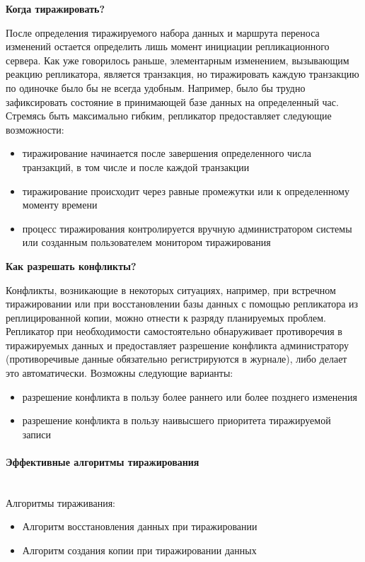 \bigbreak
\textbf{Когда тиражировать?}

После определения тиражируемого набора данных и маршрута переноса изменений остается определить лишь момент
инициации репликационного сервера. Как уже говорилось раньше, элементарным изменением, вызывающим реакцию
репликатора, является транзакция, но тиражировать каждую транзакцию по одиночке было бы не всегда удобным.
Например, было бы трудно зафиксировать состояние в принимающей базе данных на определенный час. Стремясь быть
максимально гибким, репликатор предоставляет следующие возможности:

\begin{itemize}
    \item тиражирование начинается после завершения определенного числа транзакций, в том числе и после каждой транзакции
    \item тиражирование происходит через равные промежутки или к определенному моменту времени
    \item процесс тиражирования контролируется вручную администратором системы или созданным пользователем
    монитором тиражирования
\end{itemize}

\bigbreak
\textbf{Как разрешать конфликты?}

Конфликты, возникающие в некоторых ситуациях, например, при встречном тиражировании или при
восстановлении базы данных с помощью репликатора из реплицированной копии, можно отнести к разряду планируемых
проблем. Репликатор при необходимости самостоятельно обнаруживает противоречия в тиражируемых данных и предоставляет
разрешение конфликта администратору (противоречивые данные обязательно регистрируются в журнале), либо
делает это автоматически. Возможны следующие варианты:

\begin{itemize}
    \item разрешение конфликта в пользу более раннего или более позднего изменения
    \item разрешение конфликта в пользу наивысшего приоритета тиражируемой записи
\end{itemize}

\paragraph{Эффективные алгоритмы тиражирования}~\\

Алгоритмы тираживания:
\begin{itemize}
    \item Алгоритм восстановления данных при тиражировании
    \item Алгоритм создания копии при тиражировании данных
\end{itemize}

